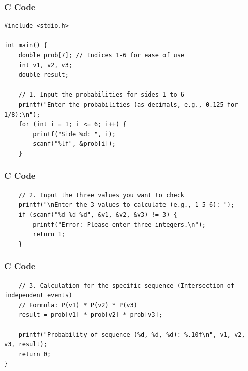 \documentclass{beamer}
\begin{document}
\begin{frame}[fragile]
\frametitle{C Code}
\begin{lstlisting}
#include <stdio.h>

int main() {
    double prob[7]; // Indices 1-6 for ease of use
    int v1, v2, v3;
    double result;

    // 1. Input the probabilities for sides 1 to 6
    printf("Enter the probabilities (as decimals, e.g., 0.125 for 1/8):\n");
    for (int i = 1; i <= 6; i++) {
        printf("Side %d: ", i);
        scanf("%lf", &prob[i]);
    }
\end{lstlisting}
\end{frame}

\begin{frame}[fragile]
\frametitle{C Code}
\begin{lstlisting}
    // 2. Input the three values you want to check
    printf("\nEnter the 3 values to calculate (e.g., 1 5 6): ");
    if (scanf("%d %d %d", &v1, &v2, &v3) != 3) {
        printf("Error: Please enter three integers.\n");
        return 1;
    }

\end{lstlisting}
\end{frame}

\begin{frame}[fragile]
\frametitle{C Code}
\begin{lstlisting}
    // 3. Calculation for the specific sequence (Intersection of independent events)
    // Formula: P(v1) * P(v2) * P(v3)
    result = prob[v1] * prob[v2] * prob[v3];

    printf("Probability of sequence (%d, %d, %d): %.10f\n", v1, v2, v3, result);
    return 0;
}
\end{lstlisting}
\end{frame}
\end{document}
